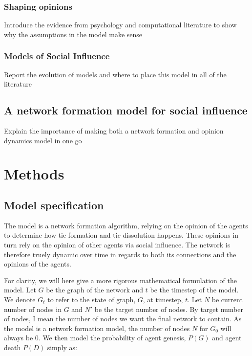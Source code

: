 \documentclass[9pt,twocolumn,twoside]{ilcss}
\begin{document}
\subsubsection{Shaping opinions}

Introduce the evidence from psychology and computational literature to show why the assumptions in the model make sense

\subsubsection{Models of Social Influence}

Report the evolution of models and where to place this model in all of the literature

\subsection{A network formation model for social influence}

Explain the importance of making both a network formation and opinion dynamics model in one go

\section{Methods}

\subsection{Model specification}

The model is a network formation algorithm, relying on the opinion of the agents to determine how tie formation and tie dissolution happens. These opinions in turn rely on the opinion of other agents via social influence. 
The network is therefore truely dynamic over time in regards to both its connections and the opinions of the agents.

For clarity, we will here give a more rigorous mathematical formulation of the model. 
Let $G$ be the graph of the network and $t$ be the timestep of the model. 
We denote $G_t$ to refer to the state of graph, $G$, at timestep, $t$. 
Let $N$ be current number of nodes in $G$ and $N'$ be the target number of nodes. By target number of nodes, I mean the number of nodes we want the final network to contain. 
As the model is a network formation model, the number of nodes $N$ for $G_0$ will always be 0. 
We then model the probability of agent genesis, $P(G)$ and agent death $P(D)$ simply as:
\end{document}
